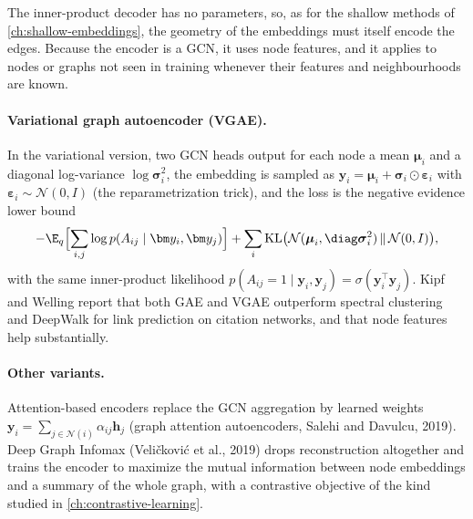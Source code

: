 \begin{notechapter}
The inner-product decoder has no parameters, so, as for the shallow methods of \cref{ch:shallow-embeddings}, the geometry of the embeddings must itself encode the edges. Because the encoder is a GCN, it uses node features, and it applies to nodes or graphs not seen in training whenever their features and neighbourhoods are known.

\paragraph{Variational graph autoencoder (VGAE).} In the variational version, two GCN heads output for each node a mean $\boldsymbol\mu_i$ and a diagonal log-variance $\log\boldsymbol\sigma_i^2$, the embedding is sampled as $\bm y_i = \boldsymbol\mu_i + \boldsymbol\sigma_i\odot\boldsymbol\varepsilon_i$ with $\boldsymbol\varepsilon_i \sim \mathcal N(0, I)$ (the reparametrization trick), and the loss is the negative evidence lower bound
\[
-\E_q\Bigl[\sum_{i,j}\log p(A_{ij}\mid\bm y_i,\bm y_j)\Bigr] + \sum_i\mathrm{KL}\bigl(\mathcal N(\boldsymbol\mu_i, \diag\boldsymbol\sigma_i^2)\,\|\,\mathcal N(0, I)\bigr),
\]
with the same inner-product likelihood $p(A_{ij} = 1\mid\bm y_i,\bm y_j) = \sigma(\bm y_i^\top\bm y_j)$. Kipf and Welling report that both GAE and VGAE outperform spectral clustering and DeepWalk for link prediction on citation networks, and that node features help substantially.

\paragraph{Other variants.} Attention-based encoders replace the GCN aggregation by learned weights $\bm y_i = \sum_{j\in\mathcal N(i)}\alpha_{ij}\bm h_j$ (graph attention autoencoders, Salehi and Davulcu, 2019). Deep Graph Infomax (Veličković et al., 2019) drops reconstruction altogether and trains the encoder to maximize the mutual information between node embeddings and a summary of the whole graph, with a contrastive objective of the kind studied in \cref{ch:contrastive-learning}.


\end{notechapter}
